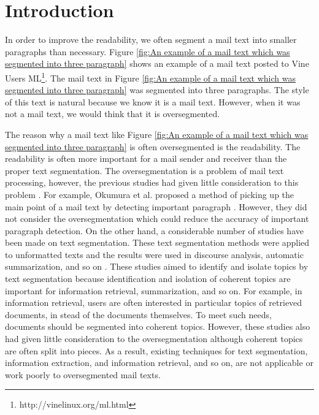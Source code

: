 \documentclass[english]{jnlp_1.4}
\begin{document}
\maketitle



\section{Introduction}
\label{sec:Introduction}

In order to improve the readability, 
we often segment a mail text into smaller paragraphs than necessary. 
Figure \ref{fig:An example of a mail text which was segmented into three paragraph} shows 
an example of a mail text 
posted to Vine Users ML\footnote[1]{http://vinelinux.org/ml.html}.
The mail text in
Figure \ref{fig:An example of a mail text which was segmented into three paragraph} was 
segmented into three paragraphs. 
The style of this text is natural 
because we know it is a mail text.
However, 
when it was not a mail text, 
we would think that it is oversegmented.

The reason why a mail text 
like Figure \ref{fig:An example of a mail text which was segmented into three paragraph} is 
often  oversegmented 
is the readability.
The readability is often more important for a mail sender and receiver
than the proper text segmentation.
The oversegmentation is a problem of mail text processing, 
however, 
the previous studies 
had given little consideration to this problem
\cite{thesis:watanabe2008}
\cite{thesis:hasegawa2004}
\cite{report:lam2002}
\cite{report:okumura2002}.
For example, 
Okumura et al. proposed a method of picking up the main point of a mail text
by detecting important paragraph \cite{report:okumura2002}.
However, 
they did not consider the oversegmentation 
which could reduce the accuracy of important paragraph detection.
On the other hand, 
a considerable number of studies have been made on text segmentation.
These text segmentation methods
were applied to unformatted texts and 
the results were used in 
discourse analysis, automatic summarization, and so on 
\cite{thesis:genzel2005}
\cite{proc:utiyama2001}
\cite{proc:matsui2004}
\cite{thesis:hearst1997}.
These studies aimed to 
identify and isolate topics by text segmentation 
because identification and isolation of coherent topics are important for 
information retrieval, summarization, and so on.
For example, 
in information retrieval, 
users are often interested in particular topics of retrieved documents, 
in stead of the documents themselves.
To meet such needs, 
documents should be segmented into coherent topics.
However, 
these studies also had given little consideration to the oversegmentation 
although coherent topics are often split into pieces.
As a result, 
existing techniques for 
text segmentation, 
information extraction, 
and information retrieval, and so on, 
are not applicable or 
work poorly to oversegmented mail texts.
\end{document}
